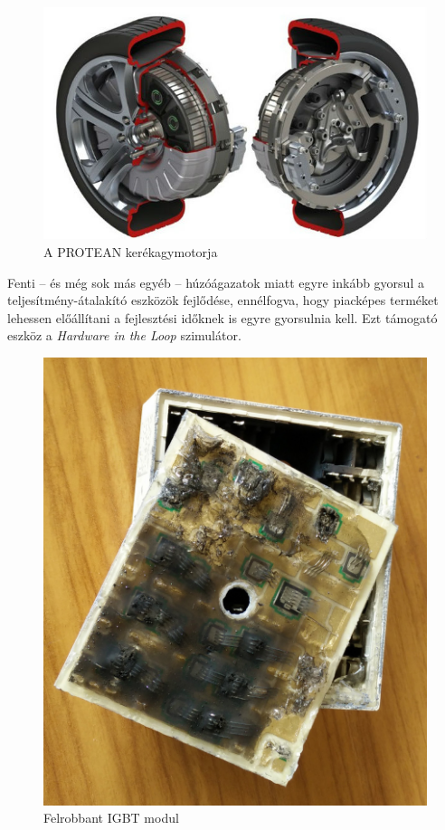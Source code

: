 \begin{figure}[H]
	\centering
	\includegraphics[width = \textwidth]{figures/protean_motor.jpg}
	\caption{A PROTEAN kerékagymotorja} 
	\label{fig:protean}
\end{figure}

Fenti -- és még sok más egyéb -- húzóágazatok miatt egyre inkább gyorsul a teljesítmény-átalakító eszközök fejlődése, ennélfogva, hogy piacképes terméket lehessen előállítani a fejlesztési időknek is egyre gyorsulnia kell. Ezt támogató eszköz a \emph{Hardware in the Loop} szimulátor. 


\begin{figure}[h]
	\centering
	\includegraphics[scale = 0.1]{figures/IMG_20160415_134241.jpg}
	\caption{Felrobbant IGBT modul} 
	\label{fig:blown}
\end{figure}

